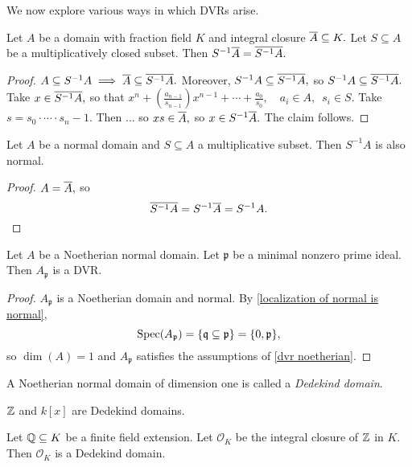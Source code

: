 We now explore various ways in which DVRs arise.

\begin{lemma}
  Let \(A\) be a domain with fraction field \(K\) and integral closure \(\overline{A} \subseteq K.\)
  Let \(S \subseteq A\) be a multiplicatively closed subset. Then
  \(S^{-1}\overline{A} = \overline{S^{-1}A}.\)
\end{lemma}
\begin{proof}
  \(A \subseteq S^{-1}A \implies \overline{A} \subseteq \overline{S^{-1}A}.\)
  Moreover,
  \(S^{-1}A \subseteq \overline{S^{-1}A},\)
  so
  \(S^{-1}A \subseteq \overline{S^{-1}A}.\)
  Take \(x \in \overline{S^{-1}A},\) so that
  \(x^n + (\frac{a_{n-1}}{s_{n-1}})x^{n-1} + \dotsb + \frac{a_0}{s_0}, \quad a_i \in A, \enspace s_i \in S.\)
  Take \(s = s_0 \cdot \dotsm \cdot s_n-1.\)
  Then
  ...
  so \(xs \in \overline{A},\)
  so \(x \in S^{-1}\overline{A}.\)
  The claim follows.
\end{proof}

\begin{corollary}
  \label{localization of normal is normal}
  Let \(A\) be a normal domain and \(S \subseteq A\) a multiplicative subset. Then \(S^{-1}A\) is also normal.
\end{corollary}
\begin{proof}
  \(A = \overline{A},\) so \[\overline{S^{-1}A} = S^{-1}\overline{A} = S^{-1}A.\]
\end{proof}

\begin{prop}
  Let \(A\) be a Noetherian normal domain. Let \(\mathfrak p\) be a minimal nonzero prime ideal. Then \(A_{\mathfrak p}\) is a DVR.
\end{prop}
\begin{proof}
  \(A_{\mathfrak p}\) is a Noetherian domain and normal. By \cref{localization of normal is normal},
  \[\text{Spec}(A_{\mathfrak p}) = \{\mathfrak q \subseteq \mathfrak p\} = \{0, \mathfrak p\},\]
  so \(\dim(A) = 1\) and \(A_{\mathfrak p}\) satisfies the assumptions of \cref{dvr noetherian}.
\end{proof}

\begin{df}
  A Noetherian normal domain of dimension one is called a \emph{Dedekind domain}.
\end{df}

\begin{example}
  \(\mathbb Z\) and \(k[x]\) are Dedekind domains.
\end{example}

\begin{theorem}[cf. Milne]
  Let \(\mathbb Q \subseteq K\) be a finite field extension. Let \(\mathcal{O}_K\) be the integral closure of \(\mathbb Z\) in \(K\).
  Then \(\mathcal{O}_K\) is a Dedekind domain.
\end{theorem}

